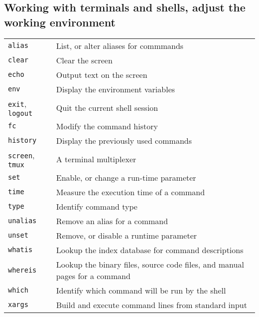 \documentclass[10pt]{article}
\begin{document}
\begin{multicols}{2}
\section{Working with terminals and shells, adjust the working environment}
\begin{tabular}{ p{2.5cm} p{8.5cm} }
  \hline
  \texttt{alias} & List, or alter aliases for commmands \\
  \texttt{clear} & Clear the screen \\
  \texttt{echo} & Output text on the screen \\
  \texttt{env} & Display the environment variables \\
  \texttt{exit}, \texttt{logout} & Quit the current shell session \\
  \texttt{fc} & Modify the command history \\
  \texttt{history} & Display the previously used commands \\
  \texttt{screen}, \texttt{tmux} & A terminal multiplexer \\
  \texttt{set} & Enable, or change a run-time parameter \\
  \texttt{time} & Measure the execution time of a command \\
  \texttt{type} & Identify command type \\
  \texttt{unalias} & Remove an alias for a command \\
  \texttt{unset} & Remove, or disable a runtime parameter \\
  \texttt{whatis} & Lookup the index database for command descriptions \\
  \texttt{whereis} & Lookup the binary files, source code files, and manual pages for a command \\
  \texttt{which} & Identify which command will be run by the shell\\
  \texttt{xargs} & Build and execute command lines from standard input \\
  \hline
\end{tabular}

\columnbreak


\end{multicols}
\end{document}
